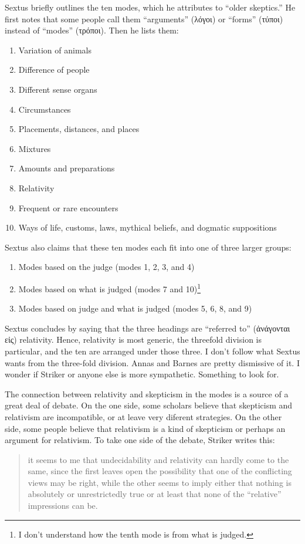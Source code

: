 Sextus briefly outlines the ten modes, which he attributes to ``older skeptics.'' He first notes that some people call them ``arguments'' (\textgreek{λόγοι}) or ``forms'' (\textgreek{τύποι}) instead of ``modes'' (\textgreek{τρόποι}). Then he lists them:
\begin{enumerate}
    \item Variation of animals
    \item Difference of people
    \item Different sense organs
    \item Circumstances
    \item Placements, distances, and places
    \item Mixtures
    \item Amounts and preparations
    \item Relativity
    \item Frequent or rare encounters
    \item Ways of life, customs, laws, mythical beliefs, and dogmatic suppositions
\end{enumerate}
Sextus also claims that these ten modes each fit into one of three larger groups:
\begin{enumerate}
    \item Modes based on the judge (modes 1, 2, 3, and 4)
    \item Modes based on what is judged (modes 7 and 10)\footnote{I don't understand how the tenth mode is from what is judged.}
    \item Modes based on judge and what is judged (modes 5, 6, 8, and 9)
\end{enumerate}
Sextus concludes by saying that the three headings are ``referred to'' (\textgreek{ἀνάγονται εἰς}) relativity. Hence, relativity is most generic, the threefold division is particular, and the ten are arranged under those three. I don't follow what Sextus wants from the three-fold division. Annas and Barnes are pretty dismissive of it.\autocite[][25--26]{annasbarnesmodes1985} I wonder if Striker or anyone else is more sympathetic. Something to look for.

The connection between relativity and skepticism in the modes is a source of a great deal of debate.\autocite{striker1983, barnes1988, belieftruthvogt2012} On the one side, some scholars believe that skepticism and relativism are incompatible, or at leave very diferent strategies. On the other side, some people believe that relativism is a kind of skepticism or perhaps an argument for relativism. To take one side of the debate, Striker writes this:
\begin{quote}
    it seems to me that undecidability and relativity can hardly come to the same, since the first leaves open the possibility that one of the conflicting views may be right, while the other seems to imply either that nothing is absolutely or unrestrictedly true or at least that none of the ``relative'' impressions can be.\autocite[96]{striker1983}
\end{quote}


